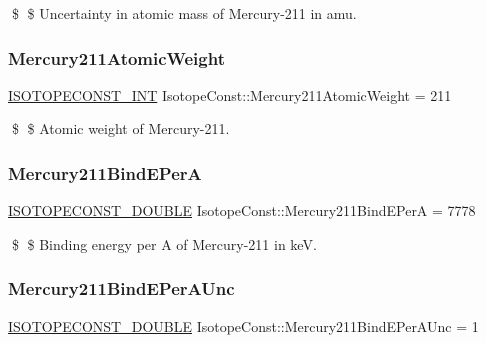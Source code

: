 \$ \$ Uncertainty in atomic mass of Mercury-\/211 in amu. \mbox{\label{group___isotope_const-_mercury-_hg211_gae3970fe8888c022fca28853e72278785}} 
\subsubsection{\texorpdfstring{Mercury211\+Atomic\+Weight}{Mercury211AtomicWeight}}
{\footnotesize\ttfamily \mbox{\hyperlink{group___isotope_const-_macros_ga5f18360b3e99483a35c32d789e62621c}{I\+S\+O\+T\+O\+P\+E\+C\+O\+N\+S\+T\+\_\+\+I\+NT}} Isotope\+Const\+::\+Mercury211\+Atomic\+Weight = 211}

\$ \$ Atomic weight of Mercury-\/211. \mbox{\label{group___isotope_const-_mercury-_hg211_gac70c55f4dee7b053836eee56893147ee}} 
\subsubsection{\texorpdfstring{Mercury211\+Bind\+E\+PerA}{Mercury211BindEPerA}}
{\footnotesize\ttfamily \mbox{\hyperlink{group___isotope_const-_macros_ga8f45a7272ce02c0b4c65c44636ed719a}{I\+S\+O\+T\+O\+P\+E\+C\+O\+N\+S\+T\+\_\+\+D\+O\+U\+B\+LE}} Isotope\+Const\+::\+Mercury211\+Bind\+E\+PerA = 7778}

\$ \$ Binding energy per A of Mercury-\/211 in keV. \mbox{\label{group___isotope_const-_mercury-_hg211_ga3bfb934d95f94b59917bdf0bd13cffc8}} 
\subsubsection{\texorpdfstring{Mercury211\+Bind\+E\+Per\+A\+Unc}{Mercury211BindEPerAUnc}}
{\footnotesize\ttfamily \mbox{\hyperlink{group___isotope_const-_macros_ga8f45a7272ce02c0b4c65c44636ed719a}{I\+S\+O\+T\+O\+P\+E\+C\+O\+N\+S\+T\+\_\+\+D\+O\+U\+B\+LE}} Isotope\+Const\+::\+Mercury211\+Bind\+E\+Per\+A\+Unc = 1}

